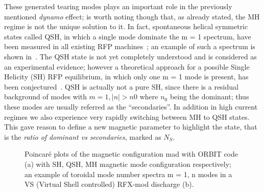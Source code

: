 These generated tearing modes plays an important role in the previously mentioned \textit{dynamo} effect; is worth noting though that, as already stated, the MH regime is not the unique solution to it. 
In fact, spontaneous helical symmetric states called \acl{QSH}, in which a single mode dominate the m = 1 spectrum, have been measured in all existing RFP machines~\cite{Martin_1999}; an example of such a spectrum is shown in~\Figure{\ref{fig:MHQSH_b}}. The QSH state is not yet completely understood and is considered as an experimental evidence; however a theoretical approach for a possible Single Helicity (SH) RFP equilibrium, in which only one m = 1 mode is present, has been conjectured~\cite{Cappello_1996}. QSH is actually not a pure SH, since there is a residual background of modes with $m = 1, |n| > n0$ where $n_0$ being the dominant; thus these modes are usually referred as the “secondaries”. In addition in high current regimes we also experience very rapidly switching between MH to QSH states. This gave reason to define a new magnetic parameter to highlight the state, that is the \textit{ratio of dominant vs secondaries}, marked as $N_S$.
\begin{figure}
    \centering
    \caption{Poincaré plots of the magnetic configuration mad with ORBIT code (a) with SH, QSH, MH magnetic mode configuration     respectively; an example of toroidal mode number spectra m = 1, n modes in a VS (Virtual Shell controlled) RFX-mod discharge (b). }
    \label{img:MHQSH_b}
\end{figure}















